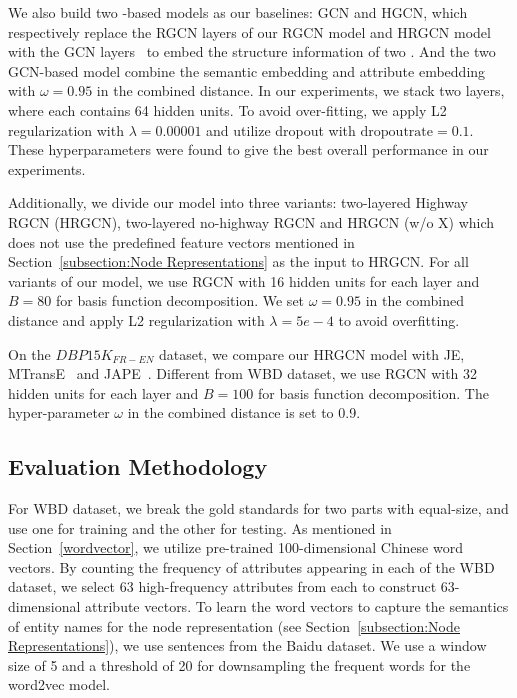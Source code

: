 	We also build two \GCN-based models as our baselines: GCN and HGCN, which respectively replace the RGCN layers of our RGCN model and HRGCN model with the GCN layers~\cite{Kipf2016Semi} to embed the structure information of two \KGs.
	And the two GCN-based model combine the semantic embedding and attribute embedding with $\omega=0.95$ in the combined distance.
	In our experiments, we stack two \GCN layers, where each \GCN contains 64 hidden units.
	To avoid over-fitting, we apply L2 regularization with $\lambda=0.00001$ and utilize dropout with $\mathrm{dropout rate}=0.1$.
	These hyperparameters were found to give the best overall performance in our experiments.
	
	Additionally, we divide our model into three variants: two-layered Highway RGCN (HRGCN), two-layered no-highway RGCN and HRGCN (w/o X)
which does not use the predefined feature vectors mentioned in Section~\ref{subsection:Node Representations} as the input to HRGCN. For all
variants of our model, we use RGCN with 16 hidden units for each layer and $B = 80$ for basis function decomposition.
	We set $\omega=0.95$ in the combined distance and apply L2 regularization with $\lambda=5e-4$ to avoid overfitting.

	
	On the $DBP15K_{FR-EN}$ dataset, we compare our HRGCN model with JE, MTransE~\cite{chen2016multilingual} and JAPE~\cite{sun2017cross}.
	Different from WBD dataset, we use RGCN with 32 hidden units for each layer and $B = 100$ for basis function decomposition.
	The hyper-parameter $\omega$ in the combined distance is set to 0.9.



	\subsection{Evaluation Methodology}
	
	For WBD dataset, we break the gold standards for two parts with equal-size, and use one for training and the other for testing.
	As mentioned in Section~\ref{wordvector}, we utilize pre-trained 100-dimensional Chinese word vectors.
	By counting the frequency of attributes appearing in each \KG of the WBD dataset, we select 63 high-frequency attributes from each \KG to construct 63-dimensional attribute vectors.
     To learn the word vectors to capture the semantics of entity names for the node representation (see Section~\ref{subsection:Node
    Representations}), we use sentences from  the Baidu dataset. We use a window size of 5 and a threshold of 20 for downsampling the frequent words
    for the word2vec model.
	
